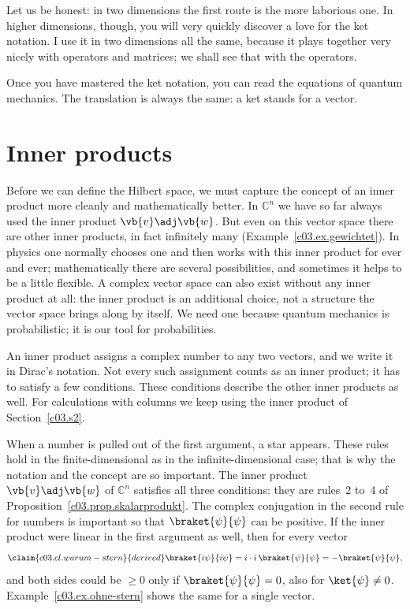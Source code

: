 Let us be honest: in two dimensions the first route is the more laborious one. In higher
dimensions, though, you will very quickly discover a love for the ket notation. I use it in two
dimensions all the same, because it plays together very nicely with operators and matrices; we
shall see that with the operators.

Once you have mastered the ket notation, you can read the equations of quantum mechanics. The
translation is always the same: a ket stands for a vector.

\section{Inner products}\label{c03.s5}

Before we can define the Hilbert space, we must capture the concept of an inner product more
cleanly and mathematically better. In $\mathbb{C}^n$ we have so far always used the inner
product $\vb{v}\adj\vb{w}$. But even on this vector space there are other inner products, in fact
infinitely many (Example~\ref{c03.ex.gewichtet}). In physics one normally chooses one and then works with this
inner product for ever and ever; mathematically there are several possibilities, and sometimes
it helps to be a little flexible. A complex vector space can also exist without any inner
product at all: the inner product is an additional choice, not a structure the vector space
brings along by itself. We need one because quantum mechanics is probabilistic; it is our tool
for probabilities.

An inner product assigns a complex number to any two vectors, and we write it in Dirac's
notation. Not every such assignment counts as an inner product; it has to satisfy a few
conditions. These conditions describe the other inner products as well. For calculations with
columns we keep using the inner product of Section~\ref{c03.s2}.


When a number is pulled out of the first argument, a star appears. These rules hold in the
finite-dimensional as in the infinite-dimensional case; that is why the notation and the concept
are so important. The inner product $\vb{v}\adj\vb{w}$ of $\mathbb{C}^n$ satisfies all three
conditions: they are rules~2 to~4 of Proposition~\ref{c03.prop.skalarprodukt}. The complex
conjugation in the second rule for numbers is important so that $\braket{\psi}{\psi}$ can be
positive. If the inner product were linear in the first argument as well, then for every vector
\begin{equation}\label{c03.eq.warum-stern}\claim{c03.cl.warum-stern}{derived}
  \braket{i\psi}{i\psi} = i \cdot i\, \braket{\psi}{\psi} = -\braket{\psi}{\psi} ,
\end{equation}
and both sides could be $\geq 0$ only if $\braket{\psi}{\psi} = 0$, also for
$\ket{\psi} \neq 0$. Example~\ref{c03.ex.ohne-stern} shows the same for a single vector.

